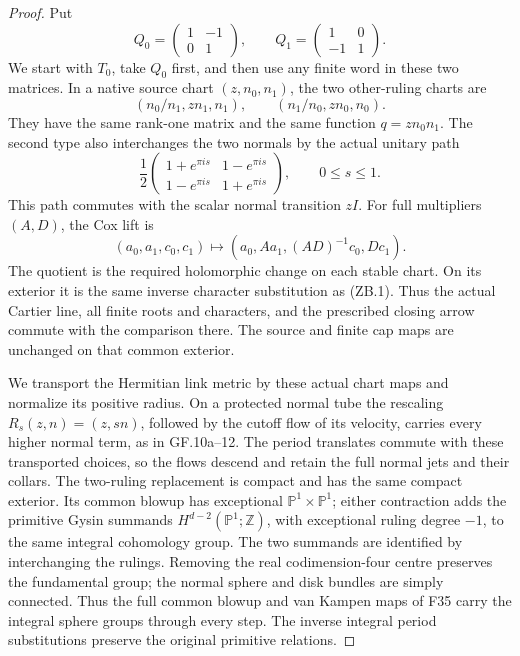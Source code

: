\begin{proof}
Put
\[
Q_0=\begin{pmatrix}1&-1\\0&1\end{pmatrix},\qquad
Q_1=\begin{pmatrix}1&0\\-1&1\end{pmatrix}.
\]
We start with \(T_0\), take \(Q_0\) first, and then use any finite
word in these two matrices. In a native source chart
\((z,n_0,n_1)\), the two other-ruling charts are
\[
(n_0/n_1,zn_1,n_1),\qquad(n_1/n_0,zn_0,n_0).              \tag{ZB.2}
\]
They have the same rank-one matrix and the same function
\(q=zn_0n_1\). The second type also interchanges the two normals by
the actual unitary path
\[
\frac12\begin{pmatrix}
1+e^{\pi is}&1-e^{\pi is}\\1-e^{\pi is}&1+e^{\pi is}
\end{pmatrix},\qquad 0\le s\le1.                         \tag{ZB.3}
\]
This path commutes with the scalar normal transition \(zI\).
For full multipliers \((A,D)\), the Cox lift is
\[
(a_0,a_1,c_0,c_1)\longmapsto
(a_0,Aa_1,(AD)^{-1}c_0,Dc_1).                            \tag{ZB.4}
\]
The quotient is the required holomorphic change on each stable chart.
On its exterior it is the same inverse character substitution as
(ZB.1). Thus the actual Cartier line, all finite roots and characters,
and the prescribed closing arrow commute with the comparison there.
The source and finite cap maps are unchanged on that common exterior.

We transport the Hermitian link metric by these actual chart maps and
normalize its positive radius. On a protected normal tube the rescaling
\(R_s(z,n)=(z,sn)\), followed by the cutoff flow of its velocity,
carries every higher normal term, as in GF.10a--12. The period
translates commute with these transported choices, so the flows descend
and retain the full normal jets and their collars. The two-ruling
replacement is compact and has the same compact exterior.
Its common blowup has exceptional \(\mathbb P^1\times\mathbb P^1\);
either contraction adds the primitive Gysin summands
\(H^{d-2}(\mathbb P^1;\mathbb Z)\), with exceptional ruling degree
\(-1\), to the same integral cohomology group. The two summands are
identified by interchanging the rulings. Removing the real
codimension-four centre preserves the fundamental group; the normal
sphere and disk bundles are simply connected. Thus the full common
blowup and van Kampen maps of F35 carry the integral sphere groups
through every step. The inverse integral period substitutions preserve
the original primitive relations.


\end{proof}

